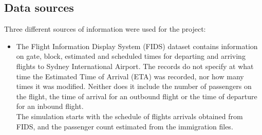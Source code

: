 \documentclass[11pt,onecolumn]{IEEEtran}
\begin{document}
\subsection{Data sources}
Three different sources of information were used for the project:
  \begin{itemize}
\item The Flight Information Display System (FIDS) dataset contains information on gate, block, estimated and scheduled times for departing and arriving flights to Sydney International Airport. 
The records do not specify at what time the Estimated Time of Arrival (ETA) was recorded, nor how many times it was modified. Neither does it include the number of passengers on the flight, the time of arrival for an outbound flight or the time of departure for an inbound flight. \\
The simulation starts with the schedule of flights arrivals obtained from FIDS, and the passenger count estimated from the immigration files.


\end{itemize}
\end{document}
